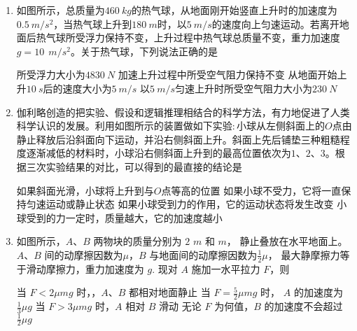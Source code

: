 \begin{enumerate}[leftmargin=0em]
\item 
{}
如图所示，总质量为$ 460 \ kg $的热气球，从地面刚开始竖直上升时的加速度为$ 0.5 \ m/s ^{2} $，当热气球上升到$ 180 \ m $时，以$ 5 \ m/s $的速度向上匀速运动。若离开地面后热气球所受浮力保持不变，上升过程中热气球总质量不变，重力加速度$ g=10 \ \ m/s ^{2} $。关于热气球，下列说法正确的是  
\begin{figure}[h!]
\centering

\end{figure}

\fourchoices
{所受浮力大小为$ 4830 \ N $}
{加速上升过程中所受空气阻力保持不变}
{从地面开始上升$ 10 \ s $后的速度大小为$ 5 \ m/s $}
{以$ 5 \ m/s $匀速上升时所受空气阻力大小为$ 230 \ N $}


\item 
{}
伽利略创造的把实验、假设和逻辑推理相结合的科学方法，有力地促进了人类科学认识的发展。利用如图所示的装置做如下实验$ : $小球从左侧斜面上的$ O $点由静止释放后沿斜面向下运动，并沿右侧斜面上升。斜面上先后铺垫三种粗糙程度逐渐减低的材料时，小球沿右侧斜面上升到的最高位置依次为$ 1 $、$ 2 $、$ 3 $。根据三次实验结果的对比，可以得到的最直接的结论是  
\begin{figure}[h!]
\centering

\end{figure}


\fourchoices
{如果斜面光滑，小球将上升到与$ O $点等高的位置}
{如果小球不受力，它将一直保持匀速运动或静止状态}
{如果小球受到力的作用，它的运动状态将发生改变}
{小球受到的力一定时，质量越大，它的加速度越小}



\item 
{}
如图所示，$ A $、$ B $ 两物块的质量分别为 $ 2 $ $ m $ 和 $ m $， 静止叠放在水平地面上。 $ A $、$ B $ 间的动摩擦因数为$ \mu $，$ B $ 与地面间的动摩擦因数为$ \frac{ 1 }{ 2 } μ $， 最大静摩擦力等于滑动摩擦力，重力加速度为 $ g $. 现对 $ A $ 施加一水平拉力 $ F $，则  
\begin{figure}[h!]
\centering

\end{figure}


\fourchoices
{当 $ F <2 \mu mg $ 时，，$ A $、$ B $ 都相对地面静止}
{当 $ F = \frac{ 5 }{ 2 } \mu mg $ 时， $ A $ 的加速度为$ \frac{ 1 }{ 3 } \mu g $}
{当 $ F >3 \mu mg $ 时，$ A $ 相对 $ B $ 滑动}
{无论 $ F $ 为何值，$ B $ 的加速度不会超过$ \frac{ 1 }{ 2 } \mu g $}



\end{enumerate}
